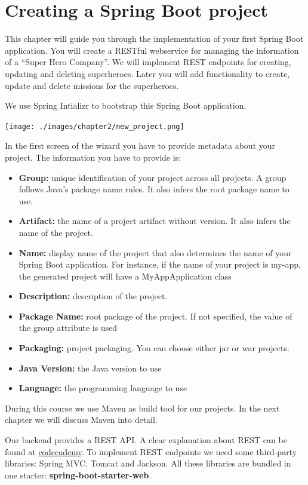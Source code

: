 \documentclass[a4paper, 12pt]{report}
\begin{document}
\section{Creating a Spring Boot project}

This chapter will guide you through the implementation of your first Spring Boot application. You will create a RESTful webservice for managing the information of a ``Super Hero Company''. We will implement REST endpoints for creating, updating and deleting superheroes. Later you will add functionality to create, update and delete missions for the superheroes.

We use Spring Intializr to bootstrap this Spring Boot application. 

\texttt{[image: ./images/chapter2/new\_project.png]} 

In the first screen of the wizard you have to provide metadata about your project.  The information you have to provide is:
\begin{itemize}
\item \textbf{Group:} unique identification of your project across all projects.  A group follows Java's package name rules. It also infers the root package name to use.
\item \textbf{Artifact:} the name of a project artifact without version.  It also infers the name of the project.
\item \textbf{Name:} display name of the project that also determines the name of your Spring Boot application. For instance,  if the name of your project is my-app, the generated project will have a MyAppApplication class
\item \textbf{Description:} description of the project.
\item \textbf{Package Name:} root package of the project. If not specified, the value of the group attribute is used
\item \textbf{Packaging:} project packaging.  You can choose either jar or war projects.
\item \textbf{Java Version:} the Java version to use
\item \textbf{Language:} the programming language to use
\end{itemize}

During this course we use Maven as build tool for our projects. In the next chapter we will discuss Maven into detail.

Our backend provides a REST API. A clear explanation about REST can be found at \href{https://www.codecademy.com/article/what-is-rest.}{codecademy}.  To implement REST endpoints we need some third-party libraries: Spring MVC, Tomcat and Jackson. All these libraries are bundled in one starter: \textbf{spring-boot-starter-web}.
\end{document}
